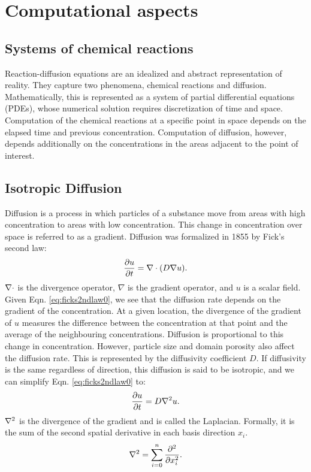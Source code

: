 \newcommand{\Morph}{u}

\chapter{Computational aspects}

\section{Systems of chemical reactions}
Reaction-diffusion equations are an idealized and abstract representation of reality. They capture two phenomena, chemical reactions and diffusion. Mathematically, this is represented as a system of partial differential equations (PDEs), whose numerical solution requires discretization of time and space. Computation of the chemical reactions at a specific point in space depends on the elapsed time and previous concentration. Computation of diffusion, however, depends additionally on the concentrations in the areas adjacent to the point of interest.

\section{Isotropic Diffusion}
Diffusion is a process in which particles of a substance move from areas with high concentration to areas with low concentration. This change in concentration over space is referred to as a gradient. Diffusion was formalized in 1855 by Fick's second law:
\begin{equation}
\label{eq:ficks2ndlaw0}
	\frac{\partial \Morph}{\partial t} = \Div (D \nabla \Morph).
\end{equation}
$\nabla \cdot$ is the divergence operator, $\nabla$ is the gradient operator, and $\Morph$ is a scalar field. Given Eqn. \ref{eq:ficks2ndlaw0}, we see that the diffusion rate depends on the gradient of the concentration. At a given location, the divergence of the gradient of $\Morph$ measures the difference between the concentration at that point and the average of the neighbouring concentrations. Diffusion is proportional to this change in concentration. However, particle size and domain porosity also affect the diffusion rate. This is represented by the diffusivity coefficient $D$. If diffusivity is the same regardless of direction, this diffusion is said to be isotropic, and we can simplify Eqn. \ref{eq:ficks2ndlaw0} to:
\begin{equation}
\label{eq:ficks2ndlaw1}
	\frac{\partial \Morph}{\partial t} = D \Lap \Morph.
\end{equation}
$\nabla^2$ is the divergence of the gradient and is called the Laplacian. Formally, it is the sum of the second spatial derivative in each basis direction $x_i$.
\begin{equation}
\label{eq:laplacian}
	\nabla^2 = \sum_{i=0}^{n} \frac{\partial^2}{\partial x_i^2}.
\end{equation}
	
